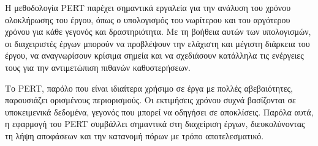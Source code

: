             Η μεθοδολογία PERT παρέχει σημαντικά εργαλεία για την ανάλυση του χρόνου ολοκλήρωσης του έργου, όπως ο υπολογισμός του νωρίτερου και του αργότερου χρόνου για κάθε γεγονός και δραστηριότητα. Με τη βοήθεια αυτών των υπολογισμών, οι διαχειριστές έργων μπορούν να προβλέψουν την ελάχιστη και μέγιστη διάρκεια του έργου, να αναγνωρίσουν κρίσιμα σημεία και να σχεδιάσουν κατάλληλα τις ενέργειες τους για την αντιμετώπιση πιθανών καθυστερήσεων.

            Το PERT, παρόλο που είναι ιδιαίτερα χρήσιμο σε έργα με πολλές αβεβαιότητες, παρουσιάζει ορισμένους περιορισμούς. Οι εκτιμήσεις χρόνου συχνά βασίζονται σε υποκειμενικά δεδομένα, γεγονός που μπορεί να οδηγήσει σε αποκλίσεις. Παρόλα αυτά, η εφαρμογή του PERT συμβάλλει σημαντικά στη διαχείριση έργων, διευκολύνοντας τη λήψη αποφάσεων και την κατανομή πόρων με τρόπο αποτελεσματικό. \cite{ProjectManagement21stCentury}


